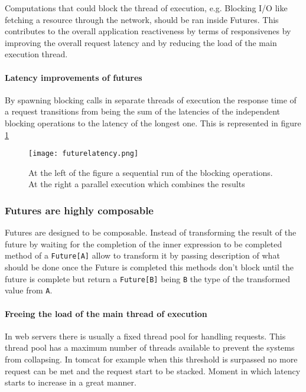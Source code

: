 \documentclass[../main.tex]{subfiles}
\begin{document}
Computations that could block the thread of execution, e.g. Blocking I/O like
fetching a resource through the network, should be ran inside Futures. This
contributes to the overall application reactiveness by terms of responsivenes by
improving the overall request latency and by reducing the load of the main
execution thread.

\paragraph{Latency improvements of futures}

By spawning blocking calls in separate threads of execution the response time of
a request transitions from being the sum of the latencies of the independent
blocking operations to the latency of the longest one. This is represented in
figure \ref{fig:futurelatency}

\begin{figure}[ht]
  \centering
  \texttt{[image: futurelatency.png]}
  \caption{\label{fig:futurelatency}
    At the left of the figure a sequential run of the blocking operations. At
    the right a parallel execution which combines the results
  }
\end{figure}

\subsubsection{Futures are highly composable}
Futures are designed to be composable. Instead of transforming the result of the
future by waiting for the completion of the inner expression to be completed
method of a \texttt{Future[A]} allow to transform it by passing description of what
should be done once the Future is completed this methods don't block until the
future is complete but return a \texttt{Future[B]} being \texttt{B} the type of the transformed
value from \texttt{A}.

\paragraph{Freeing the load of the main thread of execution}

In web servers there is usually a fixed thread pool for handling requests. This
thread pool has a maximum number of threads available to prevent the systems
from collapsing. In tomcat for example when this threshold is surpassed no more
request can be met and the request start to be stacked. Moment in which latency
starts to increase in a great manner.
\end{document}
